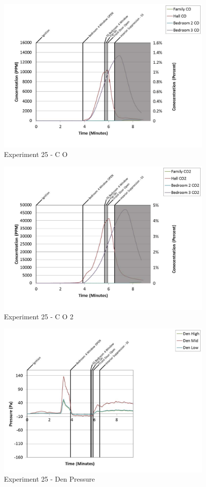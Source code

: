\documentclass{article}
\begin{document}
\begin{appendices}
	\clearpage

	\begin{figure}[h!]
		\centering
		\includegraphics[height=3.05in]{0_Images/Results_Charts/Exp_25_Charts/CO.pdf}
		\caption{Experiment 25 - C O}
	\end{figure}
 

	\begin{figure}[h!]
		\centering
		\includegraphics[height=3.05in]{0_Images/Results_Charts/Exp_25_Charts/CO2.pdf}
		\caption{Experiment 25 - C O 2}
	\end{figure}
 
	\clearpage

	\begin{figure}[h!]
		\centering
		\includegraphics[height=3.05in]{0_Images/Results_Charts/Exp_25_Charts/DenPressure.pdf}
		\caption{Experiment 25 - Den Pressure}
	\end{figure}
 


\end{appendices}
\end{document}
